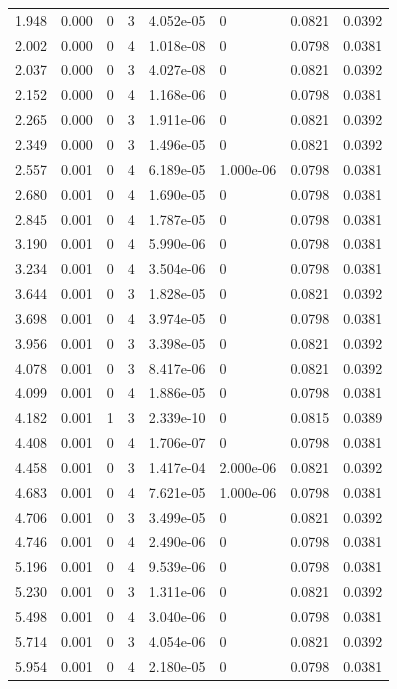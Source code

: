 \documentclass[preview]{standalone}
\begin{document}
{{\begin{tabular}{L{1.2cm}C{1.2cm} C{0.3cm}C{0.5cm} C{1.4cm}C{1.4cm} C{1.4cm}C{1.4cm}}
  1.948  &  0.000  & 0     &  3 &  4.052e-05  & 0  & 0.0821 &  0.0392   \\ 
  2.002  &  0.000  & 0     &  4 &  1.018e-08  & 0  & 0.0798 &  0.0381   \\ 
  2.037  &  0.000  & 0     &  3 &  4.027e-08  & 0  & 0.0821 &  0.0392   \\ 
  2.152  &  0.000  & 0     &  4 &  1.168e-06  & 0  & 0.0798 &  0.0381   \\ 
  2.265  &  0.000  & 0     &  3 &  1.911e-06  & 0  & 0.0821 &  0.0392   \\ 
  2.349  &  0.000  & 0     &  3 &  1.496e-05  & 0  & 0.0821 &  0.0392   \\ 
  2.557  &  0.001  & 0     &  4 &  6.189e-05  & 1.000e-06  & 0.0798 &  0.0381   \\ 
  2.680  &  0.001  & 0     &  4 &  1.690e-05  & 0  & 0.0798 &  0.0381   \\ 
  2.845  &  0.001  & 0     &  4 &  1.787e-05  & 0  & 0.0798 &  0.0381   \\ 
  3.190  &  0.001  & 0     &  4 &  5.990e-06  & 0  & 0.0798 &  0.0381   \\ 
  3.234  &  0.001  & 0     &  4 &  3.504e-06  & 0  & 0.0798 &  0.0381   \\ 
  3.644  &  0.001  & 0     &  3 &  1.828e-05  & 0  & 0.0821 &  0.0392   \\ 
  3.698  &  0.001  & 0     &  4 &  3.974e-05  & 0  & 0.0798 &  0.0381   \\ 
  3.956  &  0.001  & 0     &  3 &  3.398e-05  & 0  & 0.0821 &  0.0392   \\ 
  4.078  &  0.001  & 0     &  3 &  8.417e-06  & 0  & 0.0821 &  0.0392   \\ 
  4.099  &  0.001  & 0     &  4 &  1.886e-05  & 0  & 0.0798 &  0.0381   \\ 
  4.182  &  0.001  & 1     &  3 &  2.339e-10  & 0  & 0.0815 &  0.0389   \\ 
  4.408  &  0.001  & 0     &  4 &  1.706e-07  & 0  & 0.0798 &  0.0381   \\ 
  4.458  &  0.001  & 0     &  3 &  1.417e-04  & 2.000e-06  & 0.0821 &  0.0392   \\ 
  4.683  &  0.001  & 0     &  4 &  7.621e-05  & 1.000e-06  & 0.0798 &  0.0381   \\ 
  4.706  &  0.001  & 0     &  3 &  3.499e-05  & 0  & 0.0821 &  0.0392   \\ 
  4.746  &  0.001  & 0     &  4 &  2.490e-06  & 0  & 0.0798 &  0.0381   \\ 
  5.196  &  0.001  & 0     &  4 &  9.539e-06  & 0  & 0.0798 &  0.0381   \\ 
  5.230  &  0.001  & 0     &  3 &  1.311e-06  & 0  & 0.0821 &  0.0392   \\ 
  5.498  &  0.001  & 0     &  4 &  3.040e-06  & 0  & 0.0798 &  0.0381   \\ 
  5.714  &  0.001  & 0     &  3 &  4.054e-06  & 0  & 0.0821 &  0.0392   \\ 
  5.954  &  0.001  & 0     &  4 &  2.180e-05  & 0  & 0.0798 &  0.0381   \\ 
\hline 
\end{tabular} 

}}
\end{document}
